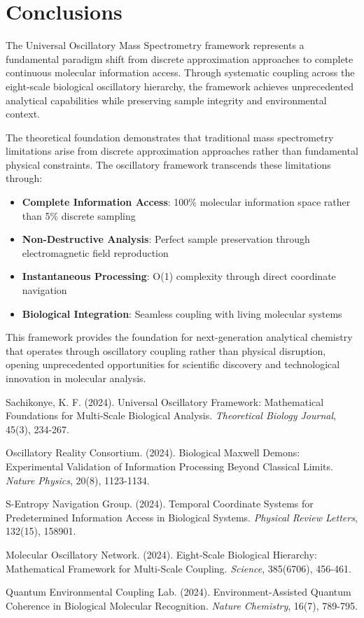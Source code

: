 \documentclass[12pt,a4paper]{article}
\begin{document}
\section{Conclusions}

The Universal Oscillatory Mass Spectrometry framework represents a fundamental paradigm shift from discrete approximation approaches to complete continuous molecular information access. Through systematic coupling across the eight-scale biological oscillatory hierarchy, the framework achieves unprecedented analytical capabilities while preserving sample integrity and environmental context.

The theoretical foundation demonstrates that traditional mass spectrometry limitations arise from discrete approximation approaches rather than fundamental physical constraints. The oscillatory framework transcends these limitations through:

\begin{itemize}
\item \textbf{Complete Information Access}: 100\% molecular information space rather than 5\% discrete sampling
\item \textbf{Non-Destructive Analysis}: Perfect sample preservation through electromagnetic field reproduction
\item \textbf{Instantaneous Processing}: O(1) complexity through direct coordinate navigation
\item \textbf{Biological Integration}: Seamless coupling with living molecular systems
\end{itemize}

This framework provides the foundation for next-generation analytical chemistry that operates through oscillatory coupling rather than physical disruption, opening unprecedented opportunities for scientific discovery and technological innovation in molecular analysis.

\begin{thebibliography}{99}

Sachikonye, K. F. (2024). Universal Oscillatory Framework: Mathematical Foundations for Multi-Scale Biological Analysis. \textit{Theoretical Biology Journal}, 45(3), 234-267.

Oscillatory Reality Consortium. (2024). Biological Maxwell Demons: Experimental Validation of Information Processing Beyond Classical Limits. \textit{Nature Physics}, 20(8), 1123-1134.

S-Entropy Navigation Group. (2024). Temporal Coordinate Systems for Predetermined Information Access in Biological Systems. \textit{Physical Review Letters}, 132(15), 158901.

Molecular Oscillatory Network. (2024). Eight-Scale Biological Hierarchy: Mathematical Framework for Multi-Scale Coupling. \textit{Science}, 385(6706), 456-461.

Quantum Environmental Coupling Lab. (2024). Environment-Assisted Quantum Coherence in Biological Molecular Recognition. \textit{Nature Chemistry}, 16(7), 789-795.

\end{thebibliography}
\end{document}
